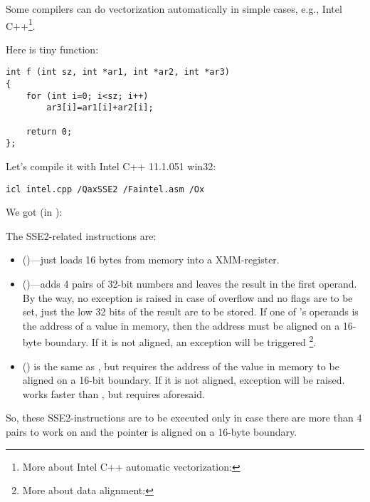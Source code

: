 
Some compilers can do vectorization automatically in simple cases, 
e.g., Intel C++\footnote{More about Intel C++ automatic vectorization: \URLINTELVEC}.

Here is tiny function:

\begin{lstlisting}
int f (int sz, int *ar1, int *ar2, int *ar3)
{
	for (int i=0; i<sz; i++)
		ar3[i]=ar1[i]+ar2[i];

	return 0;
};
\end{lstlisting}


Let's compile it with Intel C++ 11.1.051 win32:

\begin{verbatim}
icl intel.cpp /QaxSSE2 /Faintel.asm /Ox
\end{verbatim}

We got (in \IDA):



The SSE2-related instructions are:
\begin{itemize}
\item
\MOVDQU ()---just loads 16 bytes from memory into a XMM-register.

\item
\PADDD ()---adds 4 pairs of 32-bit numbers and leaves the result in the first operand.
By the way, no exception is raised in case of overflow and no flags are to be set, 
just the low 32 bits of the result are to be stored.
If one of \PADDD's operands is the address of a value in memory,
then the address must be aligned on a 16-byte boundary. 
If it is not aligned, an exception will be triggered
\footnote{More about data alignment: \URLWPDA}.

\item
\MOVDQA ()
is the same as \MOVDQU, but requires the address of the value in memory to be aligned on a 16-bit boundary.
If it is not aligned, exception will be raised.
\MOVDQA works faster than \MOVDQU, but requires aforesaid.

\end{itemize}

So, these SSE2-instructions are to be executed only in case there are more than 4 pairs to work on
and the pointer  is aligned on a 16-byte boundary.

